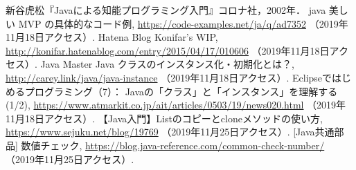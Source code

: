 \documentclass[12pt]{jarticle}
\begin{document}
\begin{thebibliography}{99}
 新谷虎松『Javaによる知能プログラミング入門』コロナ社，2002年．
 java 美しい MVP の具体的なコード例, \url{https://code-examples.net/ja/q/ad7352} （2019年11月18日アクセス）.
 Hatena Blog Konifar's WIP, \url{http://konifar.hatenablog.com/entry/2015/04/17/010606} （2019年11月18日アクセス）.
 Java Master Java クラスのインスタンス化・初期化とは？, \url{http://carey.link/java/java-instance} （2019年11月18日アクセス）.
 Eclipseではじめるプログラミング（7）： Javaの「クラス」と「インスタンス」を理解する (1/2), \url{https://www.atmarkit.co.jp/ait/articles/0503/19/news020.html} （2019年11月18日アクセス）.
 【Java入門】Listのコピーとcloneメソッドの使い方, \url{https://www.sejuku.net/blog/19769} （2019年11月25日アクセス）.
 [Java共通部品] 数値チェック, \url{https://blog.java-reference.com/common-check-number/} （2019年11月25日アクセス）.

\end{thebibliography}
\end{document}
